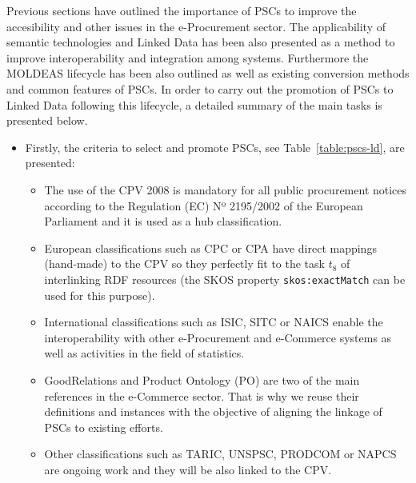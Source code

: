 Previous sections have outlined the importance of PSCs to improve the accesibility and other issues in 
the e-Procurement sector. The applicability of semantic technologies and Linked Data has been also presented 
as a method to improve interoperability and integration among systems. Furthermore the MOLDEAS lifecycle has been 
also outlined as well as existing conversion methods and common features of PSCs. In order to carry out 
the promotion of PSCs to Linked Data following this lifecycle, a detailed summary of the main tasks is presented below.

\begin{itemize}
 \item  Firstly, the criteria to select and promote PSCs, see Table~\ref{table:pscs-ld}, are presented:
\begin{itemize}
 \item The use of the CPV 2008 is mandatory for all public procurement notices according 
 to the Regulation (EC) Nº 2195/2002 of the European Parliament and it is used as a hub classification.
 \item European classifications such as CPC or CPA have direct mappings (hand-made) to the CPV so they perfectly fit 
 to the task $t_8$ of interlinking RDF resources (the SKOS property \texttt{skos:exactMatch} can be used for this purpose).
 \item International classifications such as ISIC, SITC or NAICS enable the interoperability with 
 other e-Procurement and e-Commerce systems as well as activities in the field of statistics.
 \item GoodRelations and Product Ontology (PO) are two of the main references in the e-Commerce sector. 
 That is why we reuse their definitions and instances with the objective of aligning the linkage of PSCs to existing efforts. 
 \item Other classifications such as TARIC, UNSPSC, PRODCOM or NAPCS are ongoing work and they will be also linked to the CPV.
\end{itemize}


\end{itemize}
